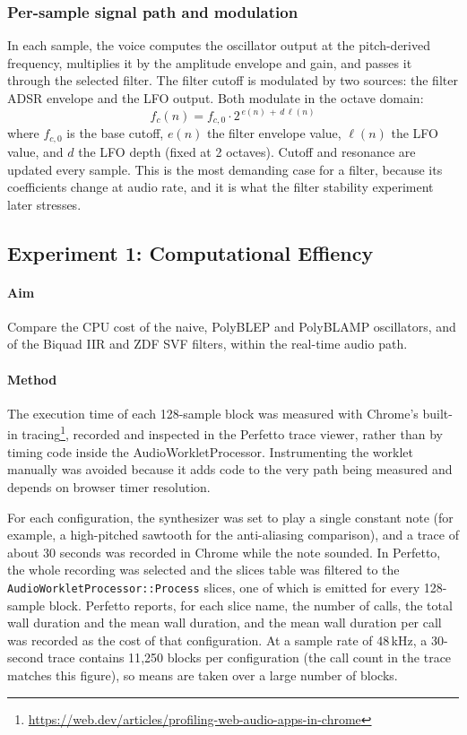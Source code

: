 \subsubsection{Per-sample signal path and modulation}
\noindent
In each sample, the voice computes the oscillator output at the pitch-derived frequency, multiplies it by the amplitude envelope and gain, and passes it through the selected filter. The filter cutoff is modulated by two sources: the filter ADSR envelope and the LFO output. Both modulate in the octave domain:
\begin{equation}
  f_c(n) = f_{c,0}\cdot 2^{\,e(n) \,+\, d\,\ell(n)}
\end{equation}
where $f_{c,0}$ is the base cutoff, $e(n)$ the filter envelope value, $\ell(n)$ the LFO value, and $d$ the LFO depth (fixed at 2 octaves). Cutoff and resonance are updated every sample. This is the most demanding case for a filter, because its coefficients change at audio rate, and it is what the filter stability experiment later stresses.

\subsection{Experiment 1: Computational Effiency}
\label{sec:cpu}
\noindent
\paragraph{Aim} Compare the CPU cost of the naive, PolyBLEP and PolyBLAMP oscillators, and of the Biquad IIR and ZDF SVF filters, within the real-time audio path.

\paragraph{Method} The execution time of each 128-sample block was measured with Chrome's built-in tracing\footnote{\url{https://web.dev/articles/profiling-web-audio-apps-in-chrome}}, recorded and inspected in the Perfetto trace viewer, rather than by timing code inside the AudioWorkletProcessor. Instrumenting the worklet manually was avoided because it adds code to the very path being measured and depends on browser timer resolution. 

For each configuration, the synthesizer was set to play a single constant note (for example, a high-pitched sawtooth for the anti-aliasing comparison), and a trace of about 30 seconds was recorded in Chrome while the note sounded. In Perfetto, the whole recording was selected and the slices table was filtered to the \texttt{AudioWorkletProcessor::Process} slices, one of which is emitted for every 128-sample block. Perfetto reports, for each slice name, the number of calls, the total wall duration and the mean wall duration, and the mean wall duration per call was recorded as the cost of that configuration. At a sample rate of 48\,kHz, a 30-second trace contains 11{,}250 blocks per configuration (the call count in the trace matches this figure), so means are taken over a large number of blocks.


